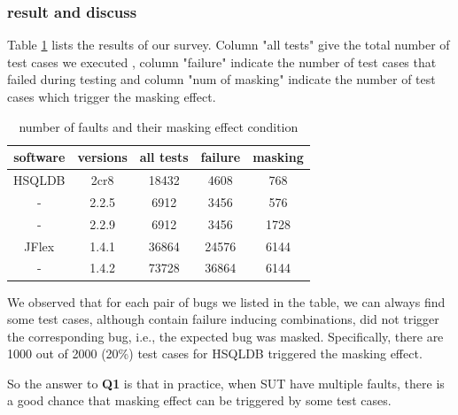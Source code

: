 \documentclass{sig-alternate}
\begin{document}
\subsubsection{result and discuss}

Table \ref{masking effect condition} lists the results of our survey. Column "all tests" give the total number of test cases we executed , column "failure" indicate the number of test cases that failed during testing and column "num of masking" indicate the number of test cases which trigger the masking effect.


\begin{table}\renewcommand{\arraystretch}{1.3}
\caption{number of faults and their masking effect condition}
\label{masking effect condition}
\begin{tabular}{c|c|c|c|c} \hline
software & versions & all tests & failure & masking\\ \hline
HSQLDB & 2cr8 & 18432 & 4608 & 768\\ \hline
     - & 2.2.5 & 6912 & 3456 & 576\\ \hline
     - & 2.2.9 & 6912 & 3456 &1728\\ \hline
JFlex & 1.4.1 & 36864 & 24576 &6144\\ \hline
     -& 1.4.2 & 73728 & 36864 &6144\\ \hline
\hline\end{tabular}
\end{table}

We observed that for each pair of bugs we listed in the table, we can always find some test cases, although contain failure inducing combinations, did not trigger the corresponding bug, i.e., the expected bug was masked. Specifically, there are 1000 out of 2000 (20\%) test cases for HSQLDB triggered the masking effect.

So the answer to \textbf{Q1} is that in practice, when SUT have multiple faults, there is a good chance that masking effect can be triggered by some test cases.

%
%
\end{document}
